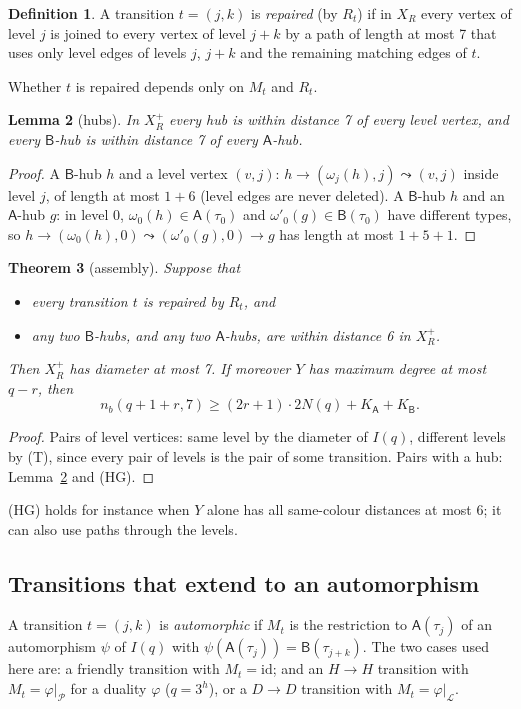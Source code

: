 \documentclass[11pt]{amsart}
\newtheorem{theorem}{Theorem}[section]
\newtheorem{lemma}[theorem]{Lemma}
\theoremstyle{definition}
\newtheorem{definition}[theorem]{Definition}
\theoremstyle{remark}
\numberwithin{equation}{section}
\newcommand{\nb}{n_b}
\newcommand{\cL}{\mathcal L}
\newcommand{\cP}{\mathcal P}
\begin{document}
\begin{definition}\label{def:repaired}
A transition $t=(j,k)$ is \emph{repaired} (by $R_t$) if in $X_R$ every vertex of level $j$ is joined to every vertex of
level $j+k$ by a path of length at most 7 that uses only level edges of levels $j$, $j+k$ and the remaining matching edges
of $t$.
\end{definition}

Whether $t$ is repaired depends only on $M_t$ and $R_t$.

\begin{lemma}[hubs]\label{lem:hubs}
In $X^+_R$ every hub is within distance 7 of every level vertex, and every $\mathsf B$-hub is within distance 7 of every
$\mathsf A$-hub.
\end{lemma}

\begin{proof}
A $\mathsf B$-hub $h$ and a level vertex $(v,j)$: $h\to(\omega_j(h),j)\leadsto(v,j)$ inside level $j$, of length at most
$1+6$ (level edges are never deleted). A $\mathsf B$-hub $h$ and an $\mathsf A$-hub $g$: in level 0,
$\omega_0(h)\in\mathsf A(\tau_0)$ and $\omega'_0(g)\in\mathsf B(\tau_0)$ have different types, so
$h\to(\omega_0(h),0)\leadsto(\omega'_0(g),0)\to g$ has length at most $1+5+1$.
\end{proof}

\begin{theorem}[assembly]\label{thm:assembly}
Suppose that
\begin{itemize}
\item[(T)] every transition $t$ is repaired by $R_t$, and
\item[(HG)] any two $\mathsf B$-hubs, and any two $\mathsf A$-hubs, are within distance 6 in $X^+_R$.
\end{itemize}
Then $X^+_R$ has diameter at most 7. If moreover $Y$ has maximum degree at most $q-r$, then
\[
\nb(q+1+r,7)\ge(2r+1)\cdot2N(q)+K_{\mathsf A}+K_{\mathsf B}.
\]
\end{theorem}

\begin{proof}
Pairs of level vertices: same level by the diameter of $I(q)$, different levels by (T), since every pair of levels is the
pair of some transition. Pairs with a hub: Lemma~\ref{lem:hubs} and (HG).
\end{proof}

(HG) holds for instance when $Y$ alone has all same-colour distances at most 6; it can also use paths through the levels.

\subsection{Transitions that extend to an automorphism}
A transition $t=(j,k)$ is \emph{automorphic} if $M_t$ is the restriction to $\mathsf A(\tau_j)$ of an automorphism $\psi$
of $I(q)$ with $\psi(\mathsf A(\tau_j))=\mathsf B(\tau_{j+k})$. The two cases used here are: a friendly transition with
$M_t=\mathrm{id}$; and an $H\to H$ transition with $M_t=\varphi|_\cP$ for a duality $\varphi$ ($q=3^h$), or a $D\to D$
transition with $M_t=\varphi|_\cL$.
\end{document}

